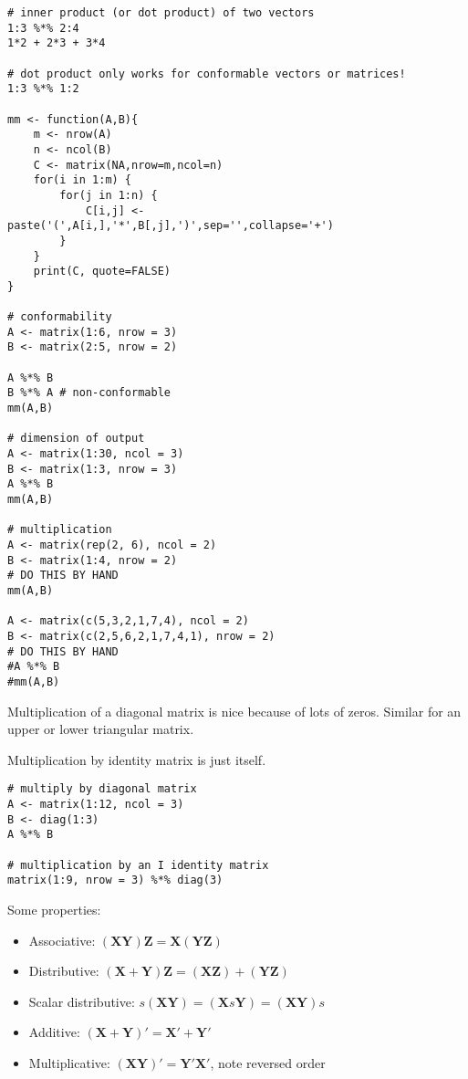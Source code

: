 \documentclass[a4paper,12pt]{article}
\newcommand{\matr}[1]{\mathbf{#1}}
\begin{document}
\begin{lstlisting}
# inner product (or dot product) of two vectors
1:3 %*% 2:4
1*2 + 2*3 + 3*4

# dot product only works for conformable vectors or matrices!
1:3 %*% 1:2

mm <- function(A,B){
    m <- nrow(A)
    n <- ncol(B)
    C <- matrix(NA,nrow=m,ncol=n)
    for(i in 1:m) {
        for(j in 1:n) {
            C[i,j] <- paste('(',A[i,],'*',B[,j],')',sep='',collapse='+')
        }
    }
    print(C, quote=FALSE)
}

# conformability
A <- matrix(1:6, nrow = 3)
B <- matrix(2:5, nrow = 2)

A %*% B
B %*% A # non-conformable
mm(A,B)

# dimension of output
A <- matrix(1:30, ncol = 3)
B <- matrix(1:3, nrow = 3)
A %*% B
mm(A,B)

# multiplication
A <- matrix(rep(2, 6), ncol = 2)
B <- matrix(1:4, nrow = 2)
# DO THIS BY HAND
mm(A,B)

A <- matrix(c(5,3,2,1,7,4), ncol = 2)
B <- matrix(c(2,5,6,2,1,7,4,1), nrow = 2)
# DO THIS BY HAND
#A %*% B
#mm(A,B)
\end{lstlisting}


Multiplication of a diagonal matrix is nice because of lots of zeros. Similar for an upper or lower triangular matrix.

Multiplication by identity matrix is just itself.

\begin{lstlisting}
# multiply by diagonal matrix
A <- matrix(1:12, ncol = 3)
B <- diag(1:3)
A %*% B

# multiplication by an I identity matrix
matrix(1:9, nrow = 3) %*% diag(3)
\end{lstlisting}

Some properties:

\begin{itemize}
\item Associative: $(\matr{X}\matr{Y})\matr{Z} = \matr{X}(\matr{Y}\matr{Z})$
\item Distributive: $(\matr{X} + \matr{Y})\matr{Z} = (\matr{X}\matr{Z}) + (\matr{Y}\matr{Z})$
\item Scalar distributive: $s(\matr{X}\matr{Y}) = (\matr{X}s\matr{Y}) = (\matr{X}\matr{Y})s$
\item Additive: $(\matr{X} + \matr{Y})' = \matr{X}' + \matr{Y}'$
\item Multiplicative: $(\matr{X}\matr{Y})' = \matr{Y}'\matr{X}'$, note reversed order
\end{itemize}
\end{document}
